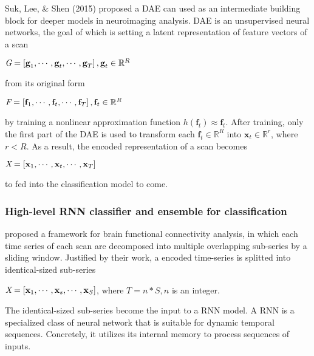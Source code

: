Suk, Lee, \& Shen (2015) proposed a DAE can used as an intermediate building block for deeper models in neuroimaging analysis. DAE is an unsupervised neural networks, the goal of which is setting a latent representation of feature vectors of a scan 
\begin{center}
$\emph{G} = \left[ \textbf{g}_1, \cdots, \textbf{g}_t, \cdots, \textbf{g}_T \right], \textbf{g}_t \in \mathbb{R}^{R}$ 
\end{center}
from its original form 
\begin{center}
$\emph{F} = \left[ \textbf{f}_1, \cdots, \textbf{f}_t, \cdots, \textbf{f}_T \right], \textbf{f}_t \in \mathbb{R}^{R} $
\end{center} 
by training a nonlinear approximation function $h(\textbf{f}_t) \approx \textbf{f}_t$. After training, only the first part of the DAE is used to transform each $\textbf{f}_t \in  \mathbb{R}^{R}$ into $ \textbf{x}_t \in  \mathbb{R}^{r}$, where $ r < R$. As a result, the encoded representation of a scan becomes
\begin{center}
$\emph{X} = \left[ \textbf{x}_1, \cdots, \textbf{x}_t, \cdots, \textbf{x}_T \right]$ 
\end{center}
to fed into the classification model to come. 

\subsubsection{High-level RNN classifier and ensemble for classification}

\textcite{wee} proposed a framework for brain functional connectivity analysis, in which each time series of each scan are decomposed into multiple overlapping sub-series by a sliding window. Justified by their work, a encoded time-series is splitted into identical-sized sub-series
\begin{center}
$\emph{X} = \left[ \textbf{x}_1, \cdots, \textbf{x}_s, \cdots, \textbf{x}_{S} \right]$, where $T=n*S, n$ is an integer. 
\end{center}
The identical-sized sub-series become the input to a RNN model. A RNN is a specialized class of neural network that is suitable for dynamic temporal sequences. Concretely, it utilizes its internal memory to process sequences of inputs.



